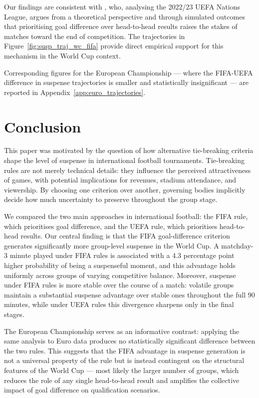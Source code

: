 \documentclass[11pt]{article}
\begin{document}
Our findings are consistent with \citet{csato2023avoid}, who, analysing the 2022/23 UEFA Nations League, argues from a theoretical perspective and through simulated outcomes that prioritising goal difference over head-to-head results raises the stakes of matches toward the end of competition. The trajectories in Figure~\ref{fig:susp_traj_wc_fifa} provide direct empirical support for this mechanism in the World Cup context.

Corresponding figures for the European Championship — where the FIFA-UEFA difference in suspense trajectories is smaller and statistically insignificant — are reported in Appendix~\ref{app:euro_trajectories}.


\section{Conclusion}
\label{sec:conclusion}

This paper was motivated by the question of how alternative tie-breaking criteria shape the level of suspense in international football tournaments. Tie-breaking rules are not merely technical details: they influence the perceived attractiveness of games, with potential implications for revenues, stadium attendance, and viewership. By choosing one criterion over another, governing bodies implicitly decide how much uncertainty to preserve throughout the group stage.

We compared the two main approaches in international football: the FIFA rule, which prioritises goal difference, and the UEFA rule, which prioritises head-to-head results. Our central finding is that the FIFA goal-difference criterion generates significantly more group-level suspense in the World Cup. A matchday-3 minute played under FIFA rules is associated with a 4.3 percentage point higher probability of being a suspenseful moment, and this advantage holds uniformly across groups of varying competitive balance. Moreover, suspense under FIFA rules is more stable over the course of a match: volatile groups maintain a substantial suspense advantage over stable ones throughout the full 90 minutes, while under UEFA rules this divergence sharpens only in the final stages.

The European Championship serves as an informative contrast: applying the same analysis to Euro data produces no statistically significant difference between the two rules. This suggests that the FIFA advantage in suspense generation is not a universal property of the rule but is instead contingent on the structural features of the World Cup — most likely the larger number of groups, which reduces the role of any single head-to-head result and amplifies the collective impact of goal difference on qualification scenarios.
\end{document}
